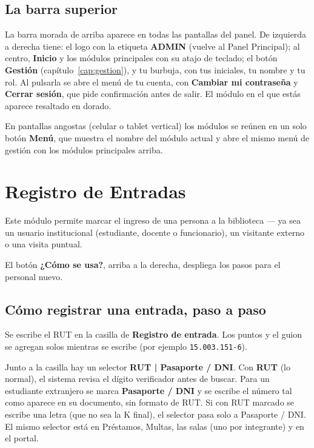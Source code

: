 \documentclass[11pt,a4paper]{report}
\begin{document}
\section{La barra superior}

La barra morada de arriba aparece en todas las pantallas del panel. De
izquierda a derecha tiene: el logo con la etiqueta \textbf{ADMIN} (vuelve
al Panel Principal); al centro, \textbf{Inicio} y los módulos principales
con su atajo de teclado; el botón \textbf{Gestión}
(capítulo~\ref{cap:gestion}), y tu burbuja, con tus iniciales, tu nombre
y tu rol. Al pulsarla se abre el menú de tu cuenta, con \textbf{Cambiar mi
contraseña} y \textbf{Cerrar sesión}, que pide confirmación antes de
salir. El módulo en el que estás aparece resaltado en dorado.

En pantallas angostas (celular o tablet vertical) los módulos se reúnen en
un solo botón \textbf{Menú}, que muestra el nombre del módulo actual y
abre el mismo menú de gestión con los módulos principales arriba.

\chapter{Registro de Entradas}

Este módulo permite marcar el ingreso de una persona a la biblioteca ---
ya sea un usuario institucional (estudiante, docente o funcionario), un
visitante externo o una visita puntual.



El botón \textbf{¿Cómo se usa?}, arriba a la derecha, despliega los pasos
para el personal nuevo.

\section{Cómo registrar una entrada, paso a paso}

Se escribe el RUT en la casilla de \textbf{Registro de entrada}. Los puntos y el guion se agregan solos mientras se
escribe (por ejemplo \texttt{15.003.151-6}).

\begin{nota}
Junto a la casilla hay un selector \textbf{RUT | Pasaporte / DNI}. Con
\textbf{RUT} (lo normal), el sistema revisa el dígito verificador antes de
buscar. Para un estudiante extranjero se marca \textbf{Pasaporte / DNI} y
se escribe el número tal como aparece en su documento, sin formato de RUT.
Si con RUT marcado se escribe una letra (que no sea la K final), el
selector pasa solo a Pasaporte / DNI. El mismo selector está en Préstamos,
Multas, las salas (uno por integrante) y en el portal.
\end{nota}
\end{document}

